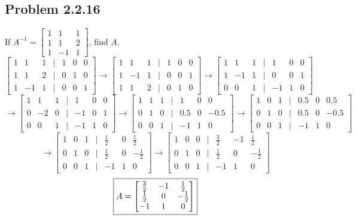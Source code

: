 \documentclass[letterpaper]{report}
\begin{document}
\subsection{Problem 2.2.16}%
\label{sub:Problem 2.2.16}
If $A^{-1} = \begin{bmatrix} 
    1 & 1 & 1 \\ 1 & 1 & 2 \\ 1 & -1 & 1
\end{bmatrix}$, find $A$. 
\[
\begin{bmatrix} 
    1 & 1 & 1 & | & 1 & 0 & 0 \\
    1 & 1 & 2 & | & 0 & 1 & 0 \\
    1 & -1 & 1 & | & 0 & 0 & 1
\end{bmatrix} \to  
\begin{bmatrix} 
    1 & 1 & 1 & | & 1 & 0 & 0 \\
    1 & -1 & 1 & | & 0 & 0 & 1 \\
    1 & 1 & 2 & | & 0 & 1 & 0 
\end{bmatrix} \to 
\begin{bmatrix} 
    1 & 1 & 1 & | & 1 & 0 & 0 \\ 
    1 & -1 & 1 & | & 0 & 0 & 1 \\
    0 & 0 & 1 & | & -1 & 1 & 0
\end{bmatrix} 
\] 
\[
\to 
\begin{bmatrix} 
    1 & 1 & 1 & | & 1 & 0 & 0 \\
    0 & -2 & 0 & | & -1 & 0 & 1 \\
    0 & 0 & 1 & | & -1 & 1 & 0 
\end{bmatrix} \to 
\begin{bmatrix} 
    1 & 1 & 1 & | & 1 & 0 & 0 \\
    0 & 1 & 0 & | & 0.5 & 0 & -0.5 \\
    0 & 0 & 1 & | & -1 & 1 & 0 
\end{bmatrix} \to 
\begin{bmatrix} 
1 & 0 & 1 & | & 0.5 & 0 & 0.5 \\
0 & 1 & 0 & | & 0.5 & 0 & -0.5 \\
0 & 0 & 1 & |&  -1 & 1 & 0
\end{bmatrix} 
\] 
\[ \to
\begin{bmatrix} 
    1 & 0 & 1 & | & \frac{1}{2} & 0 & \frac{1}{2} \\ 
    0 & 1 & 0 & | & \frac{1}{2} & 0 & -\frac{1}{2} \\
    0 & 0 & 1 & | & -1 & 1 & 0 
\end{bmatrix}  \to 
\begin{bmatrix} 
    1 & 0 & 0 & | & \frac{3}{2} & -1 & \frac{1}{2} \\
    0 & 1 & 0 & | & \frac{1}{2} & 0 & -\frac{1}{2} \\
    0 & 0 & 1 & | & -1 & 1 & 0
\end{bmatrix} 
\] 
\[
    \fbox{$ A = 
    \begin{bmatrix} 
        \frac{3}{2} & -1 & \frac{1}{2} \\
        \frac{1}{2} & 0 & -\frac{1}{2} \\
        -1 & 1 & 0 
    \end{bmatrix} 
    $}
\] 
\end{document}
